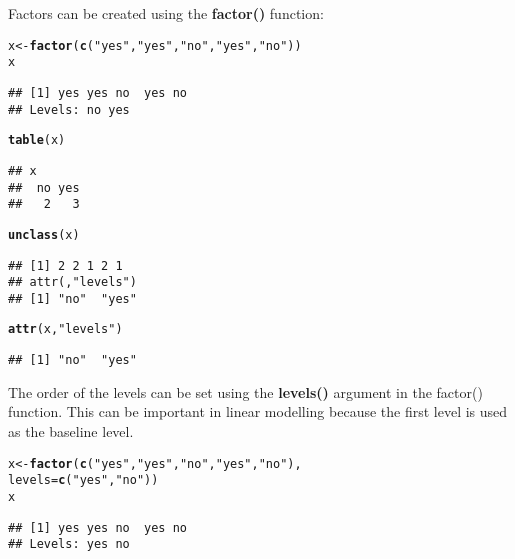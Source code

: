 \documentclass[10pt,a4paper,twoside]{article}\usepackage[]{graphicx}\usepackage[]{xcolor}
\makeatletter
\newcommand{\hlsng}[1]{\textcolor[rgb]{0.192,0.494,0.8}{#1}}%
\newcommand{\hldef}[1]{\textcolor[rgb]{0.345,0.345,0.345}{#1}}%
\newcommand{\hlkwb}[1]{\textcolor[rgb]{0.69,0.353,0.396}{#1}}%
\newcommand{\hlkwc}[1]{\textcolor[rgb]{0.333,0.667,0.333}{#1}}%
\newcommand{\hlkwd}[1]{\textcolor[rgb]{0.737,0.353,0.396}{\textbf{#1}}}%
\newenvironment{kframe}{%
 \def\at@end@of@kframe{}%
 \ifinner\ifhmode%
  \def\at@end@of@kframe{\end{minipage}}%
  \begin{minipage}{\columnwidth}%
 \fi\fi%
 \def\FrameCommand##1{\hskip\@totalleftmargin \hskip-\fboxsep
 \colorbox{shadecolor}{##1}\hskip-\fboxsep
     \hskip-\linewidth \hskip-\@totalleftmargin \hskip\columnwidth}%
 \MakeFramed {\advance\hsize-\width
   \@totalleftmargin\z@ \linewidth\hsize
   \@setminipage}}%
 {\par\unskip\endMakeFramed%
 \at@end@of@kframe}
\newenvironment{knitrout}{}{} %
\makeatother
\begin{document}
Factors can be created using the \textbf{factor()} function:

\begin{knitrout}
\color{fgcolor}\begin{kframe}
\begin{alltt}
\hldef{x} \hlkwb{<-} \hlkwd{factor}\hldef{(}\hlkwd{c}\hldef{(}\hlsng{"yes"}\hldef{,} \hlsng{"yes"}\hldef{,} \hlsng{"no"}\hldef{,} \hlsng{"yes"}\hldef{,} \hlsng{"no"}\hldef{))}
\hldef{x}
\end{alltt}
\begin{verbatim}
## [1] yes yes no  yes no 
## Levels: no yes
\end{verbatim}
\begin{alltt}
\hlkwd{table}\hldef{(x)}
\end{alltt}
\begin{verbatim}
## x
##  no yes 
##   2   3
\end{verbatim}
\begin{alltt}
\hlkwd{unclass}\hldef{(x)}
\end{alltt}
\begin{verbatim}
## [1] 2 2 1 2 1
## attr(,"levels")
## [1] "no"  "yes"
\end{verbatim}
\begin{alltt}
\hlkwd{attr}\hldef{(x,} \hlsng{"levels"}\hldef{)}
\end{alltt}
\begin{verbatim}
## [1] "no"  "yes"
\end{verbatim}
\end{kframe}
\end{knitrout}

The order of the levels can be set using the \textbf{levels()} argument in the factor() function. This can be important in linear modelling because the first level is used as the baseline level.

\begin{knitrout}
\color{fgcolor}\begin{kframe}
\begin{alltt}
\hldef{x} \hlkwb{<-} \hlkwd{factor}\hldef{(}\hlkwd{c}\hldef{(}\hlsng{"yes"}\hldef{,} \hlsng{"yes"}\hldef{,} \hlsng{"no"}\hldef{,} \hlsng{"yes"}\hldef{,} \hlsng{"no"}\hldef{),}
            \hlkwc{levels} \hldef{=} \hlkwd{c}\hldef{(}\hlsng{"yes"}\hldef{,} \hlsng{"no"}\hldef{))}
\hldef{x}
\end{alltt}
\begin{verbatim}
## [1] yes yes no  yes no 
## Levels: yes no
\end{verbatim}
\end{kframe}
\end{knitrout}
\end{document}
